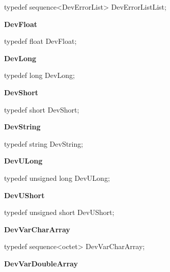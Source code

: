 typedef sequence<DevErrorList> DevErrorListList;\\

\begin{flushleft}
\textbf{DevFloat}
\par\end{flushleft}

typedef float DevFloat;\\

\begin{flushleft}
\textbf{DevLong}
\par\end{flushleft}

typedef long DevLong;\\

\begin{flushleft}
\textbf{DevShort}
\par\end{flushleft}

typedef short DevShort;\\

\begin{flushleft}
\textbf{DevString}
\par\end{flushleft}

typedef string DevString;\\

\begin{flushleft}
\textbf{DevULong}
\par\end{flushleft}

typedef unsigned long DevULong;\\

\begin{flushleft}
\textbf{DevUShort}
\par\end{flushleft}

typedef unsigned short DevUShort;\\

\begin{flushleft}
\textbf{DevVarCharArray}
\par\end{flushleft}

typedef sequence<octet> DevVarCharArray;\\

\begin{flushleft}
\textbf{DevVarDoubleArray}
\par\end{flushleft}

